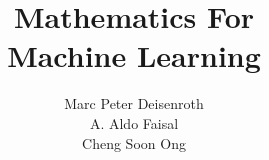 \documentclass[graybox,envcountchap,sectrefs]{svmono}
\begin{document}
\author{Marc Peter Deisenroth\\A. Aldo Faisal\\Cheng Soon Ong}
\title{Mathematics For\\Machine Learning}
\maketitle

\frontmatter
\tableofcontents
\mainmatter



\backmatter
\end{document}
